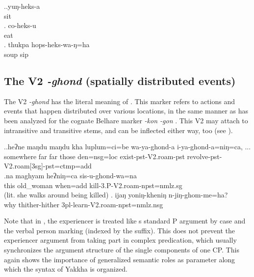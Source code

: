 \ex.\ag.yuŋ-heks-a\\
sit\\
\bg. co-heks-u\\
eat\\
\bg. thukpa hops-heks-wa-ŋ=ha\\
soup sip\\


	
\subsection{The V2 \emph{-ghond} (spatially distributed events)}\label{V2-roam}%


The V2 \emph{-ghond} has the literal meaning of . This marker refers to actions and events that happen distributed over various locations, in the same manner as has been analyzed for the cognate Belhare marker \emph{-kon \ti -gon} \citep[163]{Bickel1996Aspect}. This V2 may attach to intransitive and transitive stems, and can be inflected either way, too (see \Next).


\ex.\ag.heʔne  maŋdu maŋdu kha luplum=ci=be           wa-ya-ghond-a             i-ya-ghond-a=niŋ=ca, ...\\
somewhere far far those den{\sc =nsg=loc} exist{\sc -pst-V2.roam-pst} revolve{\sc -pst-V2.roam[3sg]-pst=ctmp=add}\\
 
\bg.na maghyam heʔniŋ=ca sis-u-ghond-wa=na\\
	this old\_woman when{\sc =add} kill{\sc -3.P-V2.roam-npst=nmlz.sg}		\\
	 (lit. she walks around being killed) 
\bg.	ijaŋ yoniŋ-kheniŋ     n-jiŋ-ghom-me=ha?\\
why thither-hither {\sc 3pl-}learn{\sc -V2.roam-npst=nmlz.nsg}\\


Note that in \Last[b], the experiencer is treated like s standard P argument  by case and the verbal person marking (indexed by the  suffix). This does not prevent the experiencer argument from taking part in complex predication, which usually synchronizes the argument structure of the single components of one CP. This again shows the importance of generalized semantic roles as parameter along which the syntax of Yakkha is organized. 

